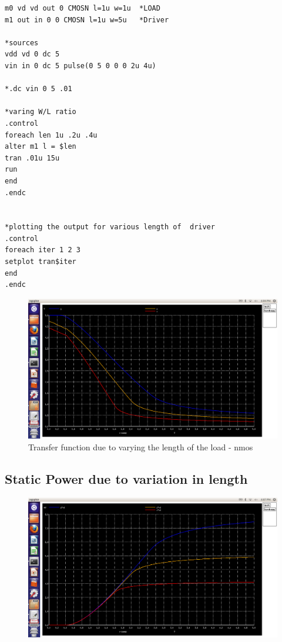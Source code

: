 \documentclass[12pt,a4paper]{article}
\begin{document}
\begin{center}
\begin{lstlisting}
m0 vd vd out 0 CMOSN l=1u w=1u  *LOAD 
m1 out in 0 0 CMOSN l=1u w=5u	*Driver

*sources
vdd vd 0 dc 5
vin in 0 dc 5 pulse(0 5 0 0 0 2u 4u)

*.dc vin 0 5 .01

*varing W/L ratio
.control
foreach len 1u .2u .4u
alter m1 l = $len
tran .01u 15u
run
end
.endc


*plotting the output for various length of  driver
.control
foreach iter 1 2 3
setplot tran$iter
end
.endc

\end{lstlisting}
\begin{figure}[!ht]
\centering
\includegraphics[scale=0.37]{lab4_pic4_5_1_transfer_fun_dueto_varing_Lof_loadnmos.png}

\caption[Short]{Transfer function due to varying the length of the load - nmos}
\end{figure}

\clearpage


\subsection{Static Power due to variation in length}
\begin{figure}[!ht]
\centering
\includegraphics[scale=0.37]{lab4_pic4_5_2_static_power_dueto_varing_Lof_loadnmos.png}


\end{figure}
\end{center}
\end{document}
